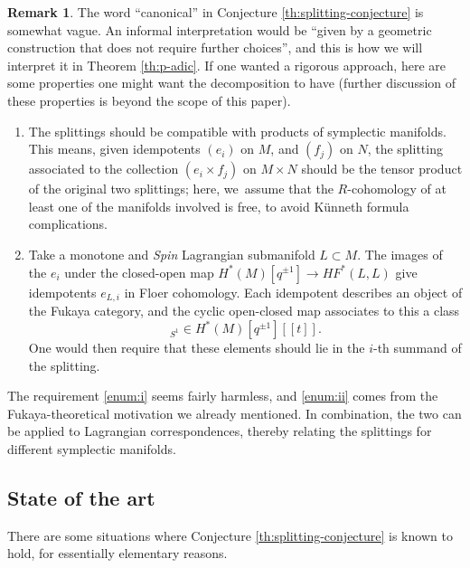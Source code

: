 \documentclass[JEP,XML,SOM,Unicode,NoFloatCountersInSection,published]{cedram}
\newcommand{\llbracket}{[\![}
\newcommand{\rrbracket}{]\!]}
\theoremstyle{plain}
\theoremstyle{definition}
\newtheorem{remark}[theorem]{Remark}
\begin{document}
\begin{remark}
The word ``canonical'' in Conjecture \ref{th:splitting-conjecture} is somewhat vague. An informal interpretation would be ``given by a geometric construction that does not require further choices'', and this is how we will interpret it in Theorem \ref{th:p-adic}. If one wanted a rigorous approach,
here are some properties one might want the decomposition to have (further discussion of these properties is beyond the scope of this paper).

\begin{enumerate}
\item\label{enum:i}
The splittings should be compatible with products of symplectic manifolds. This means, given idempotents $(e_i)$ on $M$, and $(f_j)$ on $N$, the splitting associated to the collection $(e_i \times f_j)$ on $M \times N$ should be the tensor product of the original two splittings; here, we~assume that the $R$-cohomology of at least one of the manifolds involved is free, to avoid Künneth formula complications.

\item\label{enum:ii}
Take a monotone and {\em Spin} Lagrangian submanifold $L \subset M$. The images of the $e_i$ under the closed-open map $H^*(M)[q^{\pm 1}] \to \mathit{HF}^*(L,L)$ give idempotents $e_{L,i}$ in Floer cohomology. Each idempotent describes an object of the Fukaya category, and the cyclic open-closed map \cite{ganatra23} associates to this a class
\begin{equation*}
[e_{L,i}]_{S^1} \in H^*(M)[q^{\pm 1}]\llbracket t\rrbracket.
\end{equation*}
One would then require that these elements should lie in the $i$-th summand of the splitting.
\end{enumerate}

The requirement \eqref{enum:i} seems fairly harmless, and \eqref{enum:ii} comes from the Fukaya-theore\-ti\-cal motivation we already mentioned. In combination, the two can be applied to Lagrangian correspondences, thereby relating the splittings for different symplectic manifolds.
\end{remark}

\subsection{State of the art}
There are some situations where Conjecture \ref{th:splitting-conjecture} is known to hold, for essentially elementary reasons.
\end{document}

